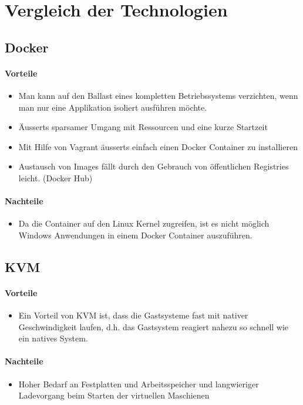 \section{Vergleich der Technologien}
\subsection{Docker}
\paragraph{Vorteile}
\begin{itemize}
	\item Man kann auf den Ballast eines kompletten Betriebssystems verzichten, wenn man nur eine Applikation isoliert ausführen möchte.
	\item Äusserts sparsamer Umgang mit Ressourcen und eine kurze Startzeit	
	\item Mit Hilfe von Vagrant äusserts einfach einen Docker Container zu installieren
	\item Austausch von Images fällt durch den Gebrauch von öffentlichen Registries leicht. (Docker Hub)
\end{itemize}
\paragraph{Nachteile}
\begin{itemize}
	\item Da die Container auf den Linux Kernel zugreifen, ist es nicht möglich Windows Anwendungen in einem Docker Container auszuführen.
\end{itemize}


\subsection{KVM} %
\paragraph{Vorteile}
\begin{itemize}
	\item Ein Vorteil von KVM ist, dass die Gastsysteme fast mit nativer Geschwindigkeit laufen, d.h. das Gastsystem reagiert nahezu so schnell wie ein natives System. 
\end{itemize}
\paragraph{Nachteile}
\begin{itemize}
	\item Hoher Bedarf an Festplatten und Arbeitsspeicher und langwieriger Ladevorgang beim Starten der virtuellen Maschienen
\end{itemize}


